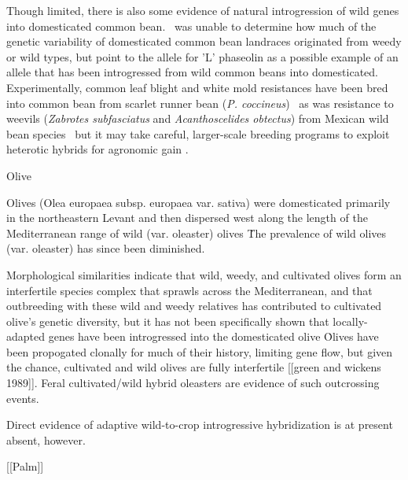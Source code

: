 \documentclass[11pt]{article}
\begin{document}
Though limited, there is also some evidence of natural introgression of wild genes into domesticated common bean.
\cite{papa2003asymmetry}\ was unable to determine how much of the genetic variability of domesticated common bean landraces originated from weedy or wild types, but point to the allele for 'L' phaseolin as a possible example of an allele that has been introgressed from wild common beans into domesticated.
Experimentally, common leaf blight and white mold resistances have been bred into common bean from scarlet runner bean (\emph{P. coccineus}) \cite{park1987transfer, schwartz2006inheritance}\, as was resistance to weevils (\emph{Zabrotes subfasciatus} and \emph{Acanthoscelides obtectus}) from Mexican wild bean species \cite{kornegay1991inheritance}\, but it may take careful, larger-scale breeding programs to exploit heterotic hybrids for agronomic gain \cite{paredes1995extensive}.










Olive

Olives (Olea europaea subsp. europaea var. sativa) were domesticated primarily in the northeastern Levant and then dispersed west along the length of the Mediterranean range of wild (var. oleaster) olives \cite{besnard2013complex}\.
The prevalence of wild olives (var. oleaster) has since been diminished.

Morphological similarities indicate that wild, weedy, and cultivated olives form an interfertile species complex that sprawls across the Mediterranean, and that outbreeding with these wild and weedy relatives has contributed to cultivated olive's genetic diversity, but it has not been specifically shown that locally-adapted genes have been introgressed into the domesticated olive \cite{zohary1975beginnings}\.

Olives have been propogated clonally for much of their history, limiting gene flow, but given the chance, cultivated and wild olives are fully interfertile [[green and wickens 1989]].
Feral cultivated/wild hybrid oleasters are evidence of such outcrossing events.

Direct evidence of adaptive wild-to-crop introgressive hybridization is at present absent, however.








[[Palm]]
\end{document}
